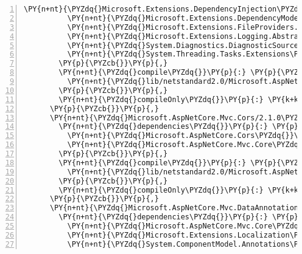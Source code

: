 \begin{Verbatim}[commandchars=\\\{\},numbers=left,firstnumber=1,stepnumber=1,numberblanklines=0]
          \PY{n+nt}{\PYZdq{}Microsoft.Extensions.DependencyInjection\PYZdq{}}\PY{p}{:} \PY{l+s+s2}{\PYZdq{}2.1.0\PYZhy{}rc1\PYZhy{}final\PYZdq{}}\PY{p}{,}
          \PY{n+nt}{\PYZdq{}Microsoft.Extensions.DependencyModel\PYZdq{}}\PY{p}{:} \PY{l+s+s2}{\PYZdq{}2.1.0\PYZhy{}rc1\PYZdq{}}\PY{p}{,}
          \PY{n+nt}{\PYZdq{}Microsoft.Extensions.FileProviders.Abstractions\PYZdq{}}\PY{p}{:} \PY{l+s+s2}{\PYZdq{}2.1.0\PYZhy{}rc1\PYZhy{}final\PYZdq{}}\PY{p}{,}
          \PY{n+nt}{\PYZdq{}Microsoft.Extensions.Logging.Abstractions\PYZdq{}}\PY{p}{:} \PY{l+s+s2}{\PYZdq{}2.1.0\PYZhy{}rc1\PYZhy{}final\PYZdq{}}\PY{p}{,}
          \PY{n+nt}{\PYZdq{}System.Diagnostics.DiagnosticSource\PYZdq{}}\PY{p}{:} \PY{l+s+s2}{\PYZdq{}4.5.0\PYZhy{}rc1\PYZdq{}}\PY{p}{,}
          \PY{n+nt}{\PYZdq{}System.Threading.Tasks.Extensions\PYZdq{}}\PY{p}{:} \PY{l+s+s2}{\PYZdq{}4.5.0\PYZhy{}rc1\PYZdq{}}
        \PY{p}{\PYZcb{}}\PY{p}{,}
        \PY{n+nt}{\PYZdq{}compile\PYZdq{}}\PY{p}{:} \PY{p}{\PYZob{}}
          \PY{n+nt}{\PYZdq{}lib/netstandard2.0/Microsoft.AspNetCore.Mvc.Core.dll\PYZdq{}}\PY{p}{:} \PY{p}{\PYZob{}}\PY{p}{\PYZcb{}}
        \PY{p}{\PYZcb{}}\PY{p}{,}
        \PY{n+nt}{\PYZdq{}compileOnly\PYZdq{}}\PY{p}{:} \PY{k+kc}{true}
      \PY{p}{\PYZcb{}}\PY{p}{,}
      \PY{n+nt}{\PYZdq{}Microsoft.AspNetCore.Mvc.Cors/2.1.0\PYZhy{}rc1\PYZhy{}final\PYZdq{}}\PY{p}{:} \PY{p}{\PYZob{}}
        \PY{n+nt}{\PYZdq{}dependencies\PYZdq{}}\PY{p}{:} \PY{p}{\PYZob{}}
          \PY{n+nt}{\PYZdq{}Microsoft.AspNetCore.Cors\PYZdq{}}\PY{p}{:} \PY{l+s+s2}{\PYZdq{}2.1.0\PYZhy{}rc1\PYZhy{}final\PYZdq{}}\PY{p}{,}
          \PY{n+nt}{\PYZdq{}Microsoft.AspNetCore.Mvc.Core\PYZdq{}}\PY{p}{:} \PY{l+s+s2}{\PYZdq{}2.1.0\PYZhy{}rc1\PYZhy{}final\PYZdq{}}
        \PY{p}{\PYZcb{}}\PY{p}{,}
        \PY{n+nt}{\PYZdq{}compile\PYZdq{}}\PY{p}{:} \PY{p}{\PYZob{}}
          \PY{n+nt}{\PYZdq{}lib/netstandard2.0/Microsoft.AspNetCore.Mvc.Cors.dll\PYZdq{}}\PY{p}{:} \PY{p}{\PYZob{}}\PY{p}{\PYZcb{}}
        \PY{p}{\PYZcb{}}\PY{p}{,}
        \PY{n+nt}{\PYZdq{}compileOnly\PYZdq{}}\PY{p}{:} \PY{k+kc}{true}
      \PY{p}{\PYZcb{}}\PY{p}{,}
      \PY{n+nt}{\PYZdq{}Microsoft.AspNetCore.Mvc.DataAnnotations/2.1.0\PYZhy{}rc1\PYZhy{}final\PYZdq{}}\PY{p}{:} \PY{p}{\PYZob{}}
        \PY{n+nt}{\PYZdq{}dependencies\PYZdq{}}\PY{p}{:} \PY{p}{\PYZob{}}
          \PY{n+nt}{\PYZdq{}Microsoft.AspNetCore.Mvc.Core\PYZdq{}}\PY{p}{:} \PY{l+s+s2}{\PYZdq{}2.1.0\PYZhy{}rc1\PYZhy{}final\PYZdq{}}\PY{p}{,}
          \PY{n+nt}{\PYZdq{}Microsoft.Extensions.Localization\PYZdq{}}\PY{p}{:} \PY{l+s+s2}{\PYZdq{}2.1.0\PYZhy{}rc1\PYZhy{}final\PYZdq{}}\PY{p}{,}
          \PY{n+nt}{\PYZdq{}System.ComponentModel.Annotations\PYZdq{}}\PY{p}{:} \PY{l+s+s2}{\PYZdq{}4.5.0\PYZhy{}rc1\PYZdq{}}

\end{Verbatim}
